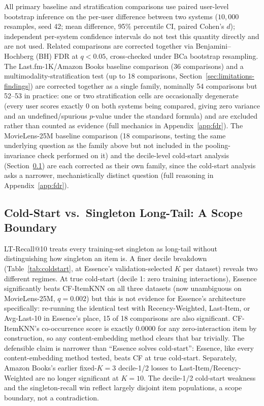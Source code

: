 \documentclass{article}
\begin{document}
All primary baseline and stratification comparisons use paired user-level bootstrap inference on the per-user difference between two systems ($10{,}000$ resamples, seed 42; mean difference, 95\% percentile CI, paired Cohen's $d$); independent per-system confidence intervals do not test this quantity directly and are not used. Related comparisons are corrected together via Benjamini--Hochberg (BH) FDR at $q<0.05$, cross-checked under BCa bootstrap resampling. The Last.fm-1K/Amazon Books baseline comparison (36 comparisons) and a multimodality-stratification test (up to 18 comparisons, Section~\ref{sec:limitations-findings}) are corrected together as a single family, nominally 54 comparisons but 52--53 in practice: one or two stratification cells are occasionally degenerate (every user scores exactly 0 on both systems being compared, giving zero variance and an undefined/spurious $p$-value under the standard formula) and are excluded rather than counted as evidence (full mechanics in Appendix~\ref{app:fdr}). The MovieLens-25M baseline comparison (18 comparisons, testing the same underlying question as the family above but not included in the pooling-invariance check performed on it) and the decile-level cold-start analysis (Section~\ref{sec:coldstart}) are each corrected as their own family, since the cold-start analysis asks a narrower, mechanistically distinct question (full reasoning in Appendix~\ref{app:fdr}).

\subsection{Cold-Start vs.\ Singleton Long-Tail: A Scope Boundary}
\label{sec:coldstart}

LT-Recall@10 treats every training-set singleton as long-tail without distinguishing how singleton an item is. A finer decile breakdown (Table~\ref{tab:coldstart}, at Essence's validation-selected $K$ per dataset) reveals two different regimes. At true cold-start (decile 1: zero training interactions), Essence significantly beats CF-ItemKNN on all three datasets (now unambiguous on MovieLens-25M, $q=0.002$) but this is not evidence for Essence's architecture specifically: re-running the identical test with Recency-Weighted, Last-Item, or Avg-Last-10 in Essence's place, 15 of 18 comparisons are also significant. CF-ItemKNN's co-occurrence score is exactly $0.0000$ for any zero-interaction item by construction, so any content-embedding method clears that bar trivially. The defensible claim is narrower than ``Essence solves cold-start'': Essence, like every content-embedding method tested, beats CF at true cold-start. Separately, Amazon Books's earlier fixed-$K=3$ decile-1/2 losses to Last-Item/Recency-Weighted are no longer significant at $K=10$. The decile-1/2 cold-start weakness and the singleton-recall win reflect largely disjoint item populations, a scope boundary, not a contradiction.
\end{document}
